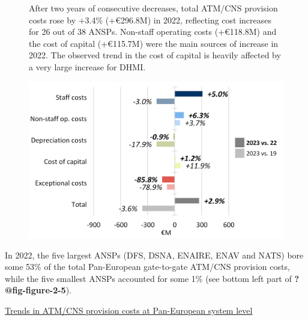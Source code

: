 \documentclass[
  letterpaper,
  DIV=11,
  numbers=noendperiod]{scrreprt}
\newenvironment{tightcenter}{%
  \setlength\topsep{5pt}
  \setlength\parskip{0pt}
  \bfseries
  \begin{center}
}{%
  \end{center}
}
\begin{document}
\begin{tcolorbox}[enhanced jigsaw, leftrule=.75mm, breakable, left=2mm, colframe=quarto-callout-note-color-frame, rightrule=.15mm, colback=white, opacityback=0, arc=.35mm, toprule=.15mm, bottomrule=.15mm]

\begin{figure}[H]

\begin{minipage}{0.35\linewidth}

\justifying \noindent \hfill\break \hfill\break After two years of
consecutive decreases, total ATM/CNS provision costs rose by +3.4\%
(+€296.8M) in 2022, reflecting cost increases for 26 out of 38 ANSPs.
Non-staff operating costs (+€118.8M) and the cost of capital (+€115.7M)
were the main sources of increase in 2022. The observed trend in the
cost of capital is heavily affected by a very large increase for
DHMI.\end{minipage}%
%
\begin{minipage}{0.65\linewidth}
\includegraphics{figures/Figure-2-4.png}\end{minipage}%

\end{figure}%

\end{tcolorbox}

\newpage{}

In 2022, the five largest ANSPs (DFS, DSNA, ENAIRE, ENAV and NATS) bore
some 53\% of the total Pan-European gate-to-gate ATM/CNS provision
costs, while the five smallest ANSPs accounted for some 1\% (see bottom
left part of \textbf{?@fig-figure-2-5}).

\hfill\break
\begin{tightcenter}
\underline{Trends in ATM/CNS provision costs at Pan-European system level}
\end{tightcenter}
\end{document}
